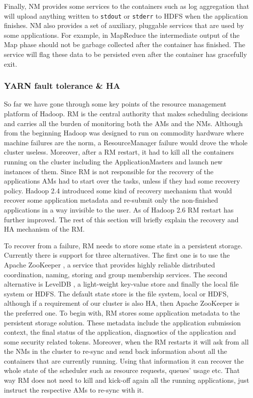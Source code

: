 Finally, NM provides some services to the containers such as log
aggregation that will upload anything written to \texttt{stdout} or \texttt{stderr} to
HDFS when the application finishes. NM also provides a set of
auxiliary, pluggable services that are used by some applications. For
example, in MapReduce the intermediate output of the Map phase should
not be garbage collected after the container has finished. The
service will flag these data to be persisted even after the container
has gracefully exit.

\subsubsection{YARN fault tolerance \& HA}
\label{sssec:yarn_ha}
So far we have gone through some key points of the resource management
platform of Hadoop. RM is the central authority that makes scheduling
decisions and carries all the burden of monitoring both the AMs and
the NMs. Although from the beginning Hadoop was designed to run on
commodity hardware where machine failures are the norm, a
ResourceManager failure would drove the whole cluster
useless. Moreover, after a RM restart, it had to kill all the
containers running on the cluster including the ApplicationMasters and
launch new instances of them. Since RM is not responsible for the
recovery of the applications AMs had to start over the tasks, unless if
they had some recovery policy. Hadoop 2.4 introduced some kind of recovery mechanism that would
recover some application metadata and re-submit only the non-finished
applications in a way invisible to the user. As of Hadoop 2.6 RM
restart has further improved. The rest of this section will briefly
explain the recovery and HA mechanism of the RM.

To recover from a failure, RM needs to
store some state in a persistent storage. Currently there is support
for three alternatives. The first one is to use the Apache ZooKeeper
\cite{Hunt:2010:ZWC:1855840.1855851}, a service that provides highly reliable
distributed coordination, naming, storing and group membership
services. The second alternative is LevelDB \cite{google_leveldb},
a light-weight key-value store and finally the local file system or
HDFS. The default state store is the file system, local or HDFS, although
if a requirement of our cluster is also HA, then Apache ZooKeeper is
the preferred one. To begin with, RM stores some application metadata to
the persistent storage solution. These metadata include the
application submission context, the final status of the application,
diagnostics of the application and some security related
tokens. Moreover, when the RM restarts it will ask from all the NMs in
the cluster to re-sync and send back information about all the
containers that are currently running. Using that information it can
recover the whole state of the scheduler such as resource requests,
queues' usage etc. That way RM does not need to kill and kick-off again all
the running applications, just instruct the respective AMs to re-sync
with it.

